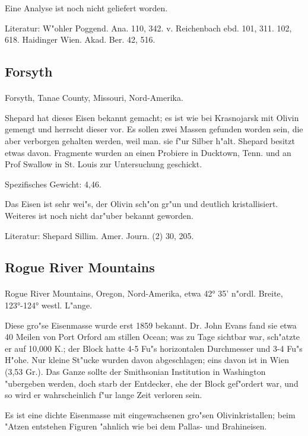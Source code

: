 \documentclass[a4paper, 11pt, oneside]{article}
\begin{document}
Eine Analyse ist noch nicht geliefert worden.

Literatur: W"ohler Poggend. Ana. 110, 342. v. Reichenbach ebd. 101, 311. 102, 618. Haidinger Wien. Akad. Ber. 42, 516.

\subsection{Forsyth}
\normalsize
\paragraph{}
Forsyth, Tanae County, Missouri, Nord-Amerika.

Shepard hat dieses Eisen bekannt gemacht; es ist wie bei Krasnojarsk mit Olivin gemengt und herrscht dieser vor. Es sollen zwei Massen gefunden worden sein, die aber verborgen gehalten werden, weil man. sie f"ur Silber h"alt. Shepard besitzt etwas davon. Fragmente wurden an einen Probiere in Ducktown, Tenn. und an Prof Swallow in St. Louis zur Untersuchung geschickt.

Spezifisches Gewicht: 4,46.

Das Eisen ist sehr wei"s, der Olivin sch"on gr"un und deutlich kristallisiert. Weiteres ist noch nicht dar"uber bekannt geworden.

Literatur: Shepard Sillim. Amer. Journ. (2) 30, 205.

\subsection{Rogue River Mountains}
\normalsize
\paragraph{}
Rogue River Mountains, Oregon, Nord-Amerika, etwa 42° 35' n"ordl. Breite, 123°-124° westl. L"ange.

Diese gro"se Eisenmasse wurde erst 1859 bekannt. Dr. John Evans fand sie etwa 40 Meilen von Port Orford am stillen Ocean; was zu Tage sichtbar war, sch"atzte er auf 10,000 K.; der Block hatte 4-5 Fu"s horizontalen Durchmesser und 3-4 Fu"s H"ohe. Nur kleine St"ucke wurden davon abgeschlagen; eins davon ist in Wien (3,53 Gr.). Das Ganze sollte der Smithsonian Institution in Washington "ubergeben werden, doch starb der Entdecker, ehe der Block gef"ordert war, und so wird er wahrscheinlich f"ur lange Zeit verloren sein.

Es ist eine dichte Eisenmasse mit eingewachsenen gro"sen Olivinkristallen; beim "Atzen entstehen Figuren "ahnlich wie bei dem Pallas- und Brahineisen.
\end{document}
